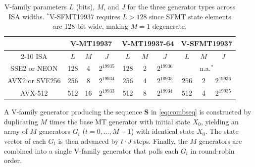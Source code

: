 \documentclass[preprint,1p,times]{elsarticle}
\begin{document}
\begin{table}[h!]
	\centering
	\small
    \renewcommand{\arraystretch}{1.2}
	\begin{tabular}{|c|c|c|c|c|c|c|c|c|c|}
		\hline
		& \multicolumn{3}{c|}{V-MT19937} & \multicolumn{3}{c|}{V-MT19937-64} & \multicolumn{3}{c|}{V-SFMT19937} \\
		\cline{2-10}
		ISA & $L$ & $M$ & $J$ & $L$ & $M$ & $J$ & $L$ & $M$ & $J$ \\
		\hline
		SSE2 or NEON & 128 & 4 & $2^{19935}$ & 128 & 2 & $2^{19936}$ & \multicolumn{3}{c|}{n.a.$^{*}$} \\
		\hline
		AVX2 or SVE256 & 256 & 8 & $2^{19934}$ & 256 & 4 & $2^{19935}$ & 256 & 2 & $2^{19936}$ \\
		\hline
		AVX-512 & 512 & 16 & $2^{19933}$ & 512 & 8 & $2^{19934}$ & 512 & 4 & $2^{19935}$ \\
		\hline
	\end{tabular}
	\caption{\label{tab:jvalues} V-family parameters $L$ (bits), $M$, and $J$ for the three generator types across ISA widths. $^{*}$V-SFMT19937 requires $L>128$ since SFMT state elements are 128-bit wide, making $M=1$ degenerate.}
\end{table}

A V-family generator producing the sequence $\boldsymbol{S}$ in \eqref{eq:combseq} is constructed by duplicating $M$ times the base MT generator with initial state $X_0$, yielding an array of $M$ generators $G_t$ ($t=0,\dots, M-1$) with identical state $X_0$. The state vector of each $G_t$ is then advanced by $t \cdot J$ steps. Finally, the $M$ generators are combined into a single V-family generator that polls each $G_t$ in round-robin order.
\end{document}
